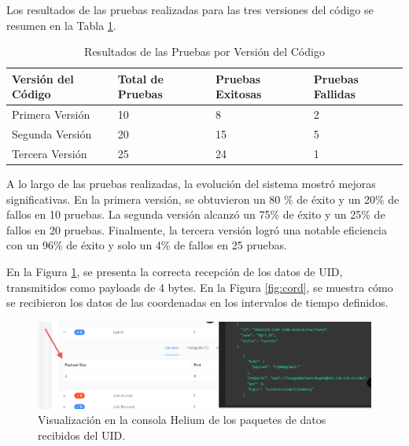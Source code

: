Los resultados de las pruebas realizadas para las tres versiones del código se resumen en la Tabla \ref{tab:pruebacompleta}.

\begin{table}[H]
\centering
\renewcommand{\arraystretch}{1.3} %
\caption{Resultados de las Pruebas por Versión del Código}
\label{tab:pruebacompleta}
\begin{tabular}{|p{3cm}|p{2.65cm}|p{2cm}|p{2.2cm}|}
\hline
\textbf{Versión del Código} & \textbf{Total de Pruebas} & \textbf{Pruebas Exitosas} & \textbf{Pruebas Fallidas} \\ \hline
Primera Versión             & 10                       & 8                         & 2                         \\ \hline
Segunda Versión             & 20                       & 15                        & 5                         \\ \hline
Tercera Versión             & 25                       & 24                        & 1                         \\ \hline
\end{tabular}
\end{table}


A lo largo de las pruebas realizadas, la evolución del sistema mostró mejoras significativas. En la primera versión, se obtuvieron un 80 \% de éxito y un 20\% de fallos en 10 pruebas. La segunda versión alcanzó un 75\% de éxito y un 25\%  de fallos en 20 pruebas. Finalmente, la tercera versión logró una notable eficiencia con un 96\%  de éxito y solo un 4\%  de fallos en 25 pruebas. 

En la Figura \ref{fig:uid}, se presenta la correcta recepción de los datos de UID, transmitidos como payloads de 4 bytes. En la Figura \ref{fig:cord}, se muestra cómo se recibieron los datos de las coordenadas en los intervalos de tiempo definidos.

\begin{figure}[H]
\leavevmode
\begin{minipage}{\textwidth}
\begin{center}
\includegraphics[width=\textwidth]{./capitulo_05/imagen/uid.png}
\caption{Visualización en la consola Helium de los paquetes de datos recibidos del UID.\label{fig:uid}}
\end{center}
\end{minipage}
\end{figure}

